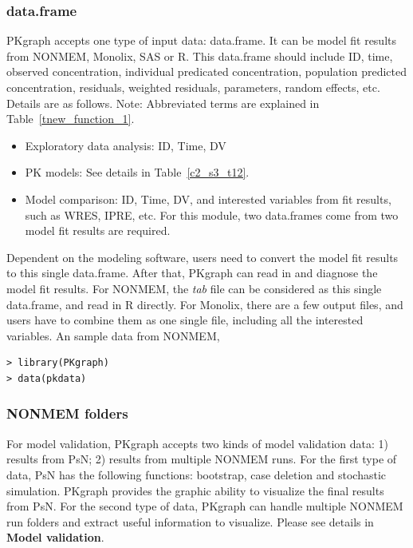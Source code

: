 \documentclass[a4paper]{article}
\begin{document}
\subsubsection{data.frame}
PKgraph accepts one type of input data: data.frame. It can be model fit results from NONMEM, Monolix, SAS or R. This data.frame should include ID, time, observed concentration, individual predicated concentration, population predicted concentration, residuals, weighted residuals, parameters, random effects, etc. Details are as follows. Note: Abbreviated terms are explained in Table~\ref{tnew_function_1}.
\begin{itemize}
	\item Exploratory data analysis: ID, Time, DV 
	\item PK models: See details in Table~\ref{c2_s3_t12}. 
	\item Model comparison: ID, Time, DV, and interested variables from fit results, such as WRES, IPRE, etc. For this module, two data.frames come from two model fit results are required.
\end{itemize}
Dependent on the modeling software, users need to convert the model fit results to this single data.frame. After that, PKgraph can read in and diagnose the model fit results. For NONMEM, the \textit{tab} file can be considered as this single data.frame, and read in R directly. For Monolix, there are a few output files, and users have to combine them as one single file, including all the interested variables.
\newline
\newline
An sample data from NONMEM,
\begin{verbatim}
> library(PKgraph)
> data(pkdata)
\end{verbatim}
\subsubsection{NONMEM folders}
For model validation, PKgraph accepts two kinds of model validation data: 1) results from PsN; 2) results from multiple NONMEM runs. For the first type of data, PsN has the following functions: bootstrap, case deletion and stochastic simulation. PKgraph provides the graphic ability to visualize the final results from PsN. For the second type of data, PKgraph can handle multiple NONMEM run folders and extract useful information to visualize.
Please see details in \textbf{Model validation}.
\end{document}
